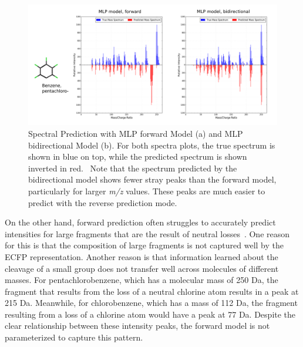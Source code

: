 \begin{figure}[t]
    \centering
    \includegraphics[width=0.9\linewidth]{./CEOCDNVZRAIOQZ-UHFFFAOYSA-N_mlp_model_spectra.png}
        \caption[Sample Spectra Prediction]{Spectral Prediction with MLP forward Model (a) and MLP bidirectional Model (b). For both spectra plots, the true spectrum is shown in blue on top, while the predicted spectrum is shown inverted in red. ~Note that the spectrum predicted by the bidirectional model shows fewer stray peaks than the forward model, particularly for larger \textit{m/z} values. These peaks are much easier to predict with the reverse prediction mode.}
    \label{fig:MLP_improvement_spectra}
\end{figure}


On the other hand, forward prediction often struggles to accurately predict intensities for large fragments that are the result of neutral losses~\cite{stein1995ChemicalSubstructureIdentification}. One reason for this is that the composition of large fragments is not captured well by the ECFP representation. Another reason is that information learned about the cleavage of a small group does not transfer well across molecules of different masses. For pentachlorobenzene, which has a molecular mass of 250 Da, the fragment that results from the loss of a neutral chlorine atom results in a peak at 215 Da. Meanwhile, for chlorobenzene, which has a mass of 112 Da, the fragment resulting from a loss of a chlorine atom would have a peak at 77 Da. Despite the clear relationship between these intensity peaks, the forward model is not parameterized to capture this pattern.

